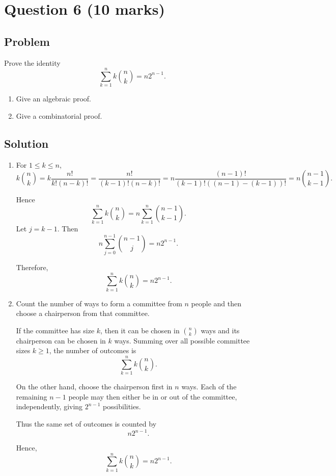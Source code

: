 \documentclass[12pt]{article}
\begin{document}
\section{Question 6 \hfill (10 marks)}
\subsection{Problem}

Prove the identity
\[
\sum_{k=1}^{n} k\binom{n}{k}=n2^{n-1}.
\]

\begin{enumerate}[label=(\alph*)]
    \item Give an algebraic proof.
    \item Give a combinatorial proof.
\end{enumerate}

\subsection{Solution}

\begin{enumerate}[label=(\alph*)]
    \item For $1\le k\le n$,
    \[
    k\binom{n}{k}
    =k\frac{n!}{k!(n-k)!}
    =\frac{n!}{(k-1)!(n-k)!}
    =n\frac{(n-1)!}{(k-1)!((n-1)-(k-1))!}
    =n\binom{n-1}{k-1}.
    \]

    Hence
    \[
    \sum_{k=1}^{n} k\binom{n}{k}
    =n\sum_{k=1}^{n} \binom{n-1}{k-1}.
    \]
    Let $j=k-1$. Then
    \[
    n\sum_{j=0}^{n-1} \binom{n-1}{j}
    =n2^{n-1}.
    \]

    Therefore,
    \[
    \boxed{\sum_{k=1}^{n} k\binom{n}{k}=n2^{n-1}}.
    \]

    \item Count the number of ways to form a committee from $n$ people and then choose a chairperson from that committee.

    If the committee has size $k$, then it can be chosen in $\binom{n}{k}$ ways and its chairperson can be chosen in $k$ ways. Summing over all possible committee sizes $k\ge 1$, the number of outcomes is
    \[
    \sum_{k=1}^{n} k\binom{n}{k}.
    \]

    On the other hand, choose the chairperson first in $n$ ways. Each of the remaining $n-1$ people may then either be in or out of the committee, independently, giving $2^{n-1}$ possibilities.

    Thus the same set of outcomes is counted by
    \[
    n2^{n-1}.
    \]

    Hence,
    \[
    \boxed{\sum_{k=1}^{n} k\binom{n}{k}=n2^{n-1}}.
    \]
\end{enumerate}
\end{document}
